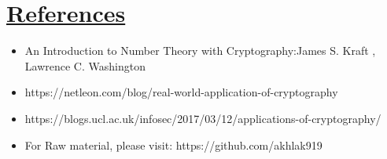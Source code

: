 \documentclass[a4paper,12pt]{article}
\begin{document}
        \vspace*{1cm}

        \section*{\underline{References}}

        \vspace*{0.3cm}

        \begin{itemize}
            \item   An Introduction to Number Theory with Cryptography:James S. Kraft , Lawrence C. Washington
            \item  https://netleon.com/blog/real-world-application-of-cryptography
            \item  https://blogs.ucl.ac.uk/infosec/2017/03/12/applications-of-cryptography/
            \item For Raw material, please visit: https://github.com/akhlak919
        \end{itemize}
\end{document}
